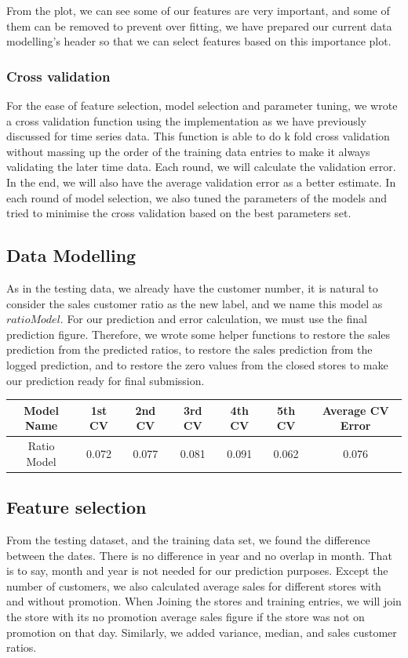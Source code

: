 \documentclass{article}
\begin{document}
From the plot, we can see some of our features are very important, and some of them can be removed to prevent over fitting, we have prepared our current data modelling's header so that we can select features based on this importance plot.

\subsubsection{Cross validation}
For the ease of feature selection, model selection and parameter tuning, we wrote a cross validation function using the implementation as we have previously discussed for time series data. This function is able to do k fold cross validation without massing up the order of the training data entries to make it always validating the later time data. Each round, we will calculate the validation error. In the end, we will also have the average validation error as a better estimate. In each round of model selection, we also tuned the parameters of the models and tried to minimise the cross validation based on the best parameters set.
 
\subsection{Data Modelling}
As in the testing data, we already have the customer number, it is natural to consider the sales customer ratio as the new label, and we name this model as $ratioModel$. For our prediction and error calculation, we must use the final prediction figure. Therefore, we wrote some helper functions to restore the sales prediction from the predicted ratios, to restore the sales prediction from the logged prediction, and to restore the zero values from the closed stores to make our prediction ready for final submission.

\begin{center}
 \begin{tabular}{||c c c c c c c||} 
 \hline
 Model Name & 1st CV & 2nd CV & 3rd CV & 4th CV & 5th CV & Average CV Error \\ [0.5ex] 
 \hline\hline
 Ratio Model & 0.072 & 0.077 & 0.081 & 0.091 & 0.062 & 0.076 \\[1ex] 
 \hline
\end{tabular}
\end{center}

\subsection{Feature selection}
From the testing dataset, and the training data set, we found the difference between the dates. There is no difference in year and no overlap in month. That is to say, month and year is not needed for our prediction purposes. Except the number of customers, we also calculated average sales for different stores with and without promotion. When Joining the stores and training entries, we will join the store with its no promotion average sales figure if the store was not on promotion on that day. Similarly, we added variance, median, and sales customer ratios.\\
\end{document}
